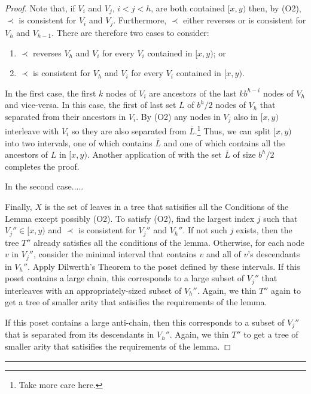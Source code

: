 \documentclass[kpfonts]{patmorin}
\begin{document}
\begin{proof}
  Note that, if $V_i$ and $V_j$, $i<j<h$, are both contained $[x,y)$ then, by (O2), $\prec$ is consistent for $V_i$ and $V_j$.  Furthermore, $\prec$ either reverses or is consistent for $V_h$ and $V_{h-1}$.  There are therefore two cases to consider:
  \begin{enumerate}
    \item $\prec$ reverses $V_h$ and $V_i$ for every $V_i$ contained in $[x,y)$; or
    \item $\prec$ is consistent for $V_h$ and $V_i$ for every $V_i$ contained in $[x,y)$.
  \end{enumerate}
  In the first case, the first $k$ nodes of $V_i$ are ancestors of the last $kb^{h-i}$ nodes of $V_{h}$ and vice-versa.  In this case, the first of last set $\overline{L}$ of $b^{h}/2$ nodes of $V_h$ that separated from their ancestors in $V_i$.  By (O2) any nodes in $V_j$ also in $[x,y)$ interleave with $V_i$ so they are also separated from $\overline{L}$.\footnote{Take more care here.}  Thus, we can split $[x,y)$ into two intervals, one of which contains $\overline{L}$ and one of which contains all the ancestors of $L$ in $[x,y)$.  Another application of  with the set $\overline{L}$ of size $b^h/2$ completes the proof.
  
  In the second case.....
  
  
  Finally, $X$ is the set of leaves in a tree that satisifies all the Conditions of the Lemma except possibly (O2).  To satisfy (O2), find the largest index $j$ such that $V_j''\in [x,y)$ and $\prec$ is consistent for $V_j''$ and $V_h''$.  If not such $j$ exists, then the tree $T''$ already satisfies all the conditions of the lemma. Otherwise, for each node $v$ in $V_j''$, consider the minimal interval that contains $v$ and all of $v$'s descendants in $V_h''$.  Apply Dilwerth's Theorem to the poset defined by these intervals.  If this poset contains a large chain, this corresponds to a large subset of $V_j''$ that interleaves with an appropriately-sized subset of $V_h''$.  Again, we thin $T''$ again to get a tree of smaller arity that satisifies the requirements of the lemma.
  
  If this poset contains a large anti-chain, then this corresponds to a subset of $V_{j}''$ that is separated from its descendants in $V_{h}''$.  Again, we thin $T''$ to get a tree of smaller arity that satisifies the requirements of the lemma.
\end{proof}  


\hrule
\end{document}

